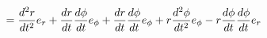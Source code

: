 \documentclass[preview]{standalone}
\begin{document}
\begin{align*}
= {d^2 r \over dt^2} e_r + {d r \over dt} {d \phi \over dt} e_\phi + {d r \over dt} {d \phi \over dt} e_\phi + r {d^2 \phi \over dt^2} e_\phi - r {d \phi \over dt} {d \phi \over dt} e_{ r}
\end{align*}
\end{document}
